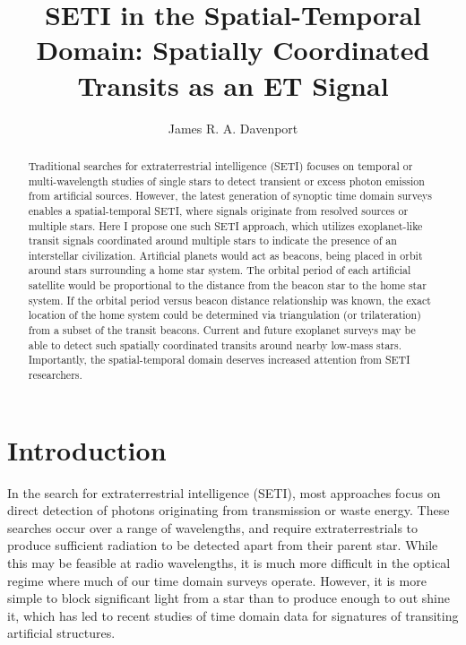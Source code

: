 \documentclass[iop]{emulateapj}
\begin{document}
\title{SETI in the Spatial-Temporal Domain: Spatially Coordinated Transits as an ET Signal}


\author{
	James R. A. Davenport
	}

 

\begin{abstract}
Traditional searches for extraterrestrial intelligence (SETI) focuses on temporal or multi-wavelength studies of single stars to detect transient or excess photon emission from artificial sources. However, the latest generation of synoptic time domain surveys enables a spatial-temporal SETI, where signals originate from resolved sources or multiple stars. Here I propose one such SETI approach, which utilizes exoplanet-like transit signals coordinated around multiple stars to indicate the presence of an interstellar civilization. Artificial planets would act as beacons, being placed in orbit around stars surrounding a home star system. The orbital period of each artificial satellite would be proportional to the distance from the beacon star to the home star system. If the orbital period versus beacon distance relationship was known, the exact location of the home system could be determined via triangulation (or trilateration) from a subset of the transit beacons. Current and future exoplanet surveys may be able to detect such spatially coordinated transits around nearby low-mass stars. Importantly, the spatial-temporal domain deserves increased attention from SETI researchers.
\end{abstract}


\section{Introduction}

In the search for extraterrestrial intelligence (SETI), most approaches focus on direct detection of photons originating from transmission or waste energy. These searches occur over a range of wavelengths, and require extraterrestrials to produce sufficient radiation to be detected apart from their parent star. While this may be feasible at radio wavelengths, it is much more difficult in the optical regime where much of our time domain surveys operate. However,  it is more simple to block significant light from a star than to produce enough to out shine it, which has led to recent studies of time domain data for signatures of transiting artificial structures. 
\end{document}
